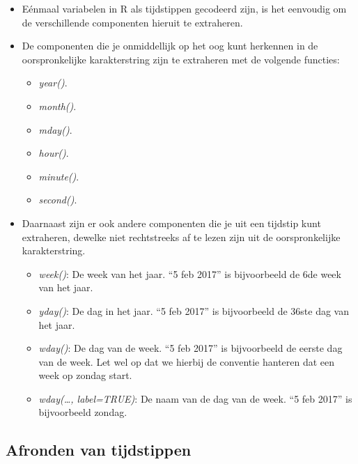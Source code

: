 \documentclass[]{memoir}
\providecommand{\tightlist}{%
  \setlength{\itemsep}{0pt}\setlength{\parskip}{0pt}}
\begin{document}
\begin{itemize}
\tightlist
\item
  Eénmaal variabelen in R als tijdstippen gecodeerd zijn, is het
  eenvoudig om de verschillende componenten hieruit te extraheren.
\item
  De componenten die je onmiddellijk op het oog kunt herkennen in de
  oorspronkelijke karakterstring zijn te extraheren met de volgende
  functies:

  \begin{itemize}
  \tightlist
  \item
    \emph{year()}.
  \item
    \emph{month()}.
  \item
    \emph{mday()}.
  \item
    \emph{hour()}.
  \item
    \emph{minute()}.
  \item
    \emph{second()}.
  \end{itemize}
\item
  Daarnaast zijn er ook andere componenten die je uit een tijdstip kunt
  extraheren, dewelke niet rechtstreeks af te lezen zijn uit de
  oorspronkelijke karakterstring.

  \begin{itemize}
  \tightlist
  \item
    \emph{week()}: De week van het jaar. ``5 feb 2017'' is bijvoorbeeld
    de 6de week van het jaar.
  \item
    \emph{yday()}: De dag in het jaar. ``5 feb 2017'' is bijvoorbeeld de
    36ste dag van het jaar.
  \item
    \emph{wday()}: De dag van de week. ``5 feb 2017'' is bijvoorbeeld de
    eerste dag van de week. Let wel op dat we hierbij de conventie
    hanteren dat een week op zondag start.
  \item
    \emph{wday(\ldots{}, label=TRUE)}: De naam van de dag van de week.
    ``5 feb 2017'' is bijvoorbeeld zondag.
  \end{itemize}
\end{itemize}

\subsection{Afronden van tijdstippen}\label{afronden-van-tijdstippen}
\end{document}
